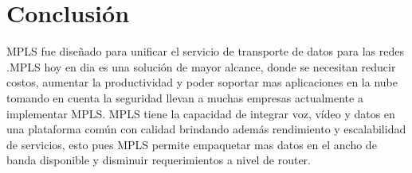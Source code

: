 \documentclass[10pt,journal,compsoc]{IEEEtran}
\begin{document}
%






\section{Conclusión}

 MPLS fue diseñado para unificar el servicio de transporte de datos para las redes .MPLS hoy en dia es una solución de mayor alcance, donde se necesitan reducir costos, aumentar la productividad y poder soportar mas aplicaciones en la nube tomando en cuenta la seguridad llevan a muchas empresas actualmente a implementar MPLS. MPLS tiene la capacidad de integrar voz, vídeo y datos en una plataforma común con calidad brindando además rendimiento y escalabilidad de servicios, esto pues MPLS permite empaquetar mas datos en el ancho de banda disponible y disminuir requerimientos a nivel de router.
 
\end{document}
